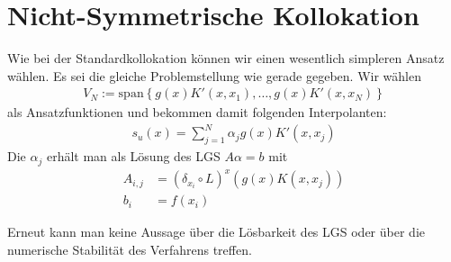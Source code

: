 \section{Nicht-Symmetrische Kollokation}
Wie bei der Standardkollokation können wir einen wesentlich simpleren Ansatz wählen. Es sei die gleiche Problemstellung wie gerade gegeben. Wir wählen 
\begin{align*}
V_N:= \text{span} \left\{g(x)K'(x,x_1), \dots, g(x)K'(x,x_N)\right\}
\end{align*}
als Ansatzfunktionen und bekommen damit folgenden Interpolanten:
\begin{align*}
s_u (x) = \sum_{j=1}^N \alpha_j g(x)K'(x,x_j)
\end{align*}
Die $\alpha_j$ erhält man als Lösung des \ac{LGS} $A\alpha = b$ mit 
\begin{align*}
A_{i,j} &= (\delta_{x_i} \circ L)^x (g(x) K(x,x_j))\\
b_i &= f(x_i)
\end{align*}

Erneut kann man keine Aussage über die Lösbarkeit des \ac{LGS} oder über die numerische Stabilität des Verfahrens treffen.